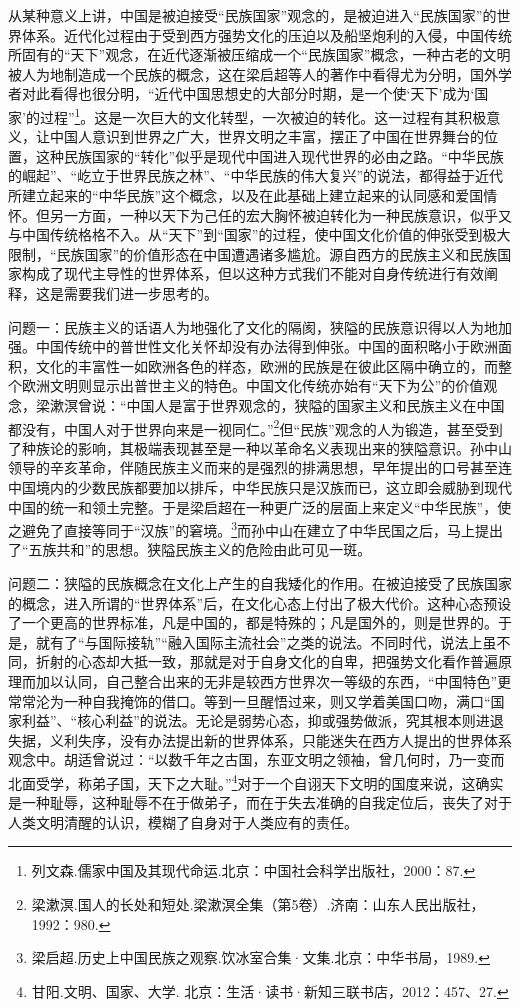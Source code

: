 \documentclass[UTF8, 12pt, a4paper]{ctexrep}
\begin{document}
从某种意义上讲，中国是被迫接受“民族国家”观念的，是被迫进入“民族国家”的世界体系。近代化过程由于受到西方强势文化的压迫以及船坚炮利的入侵，中国传统所固有的“天下”观念，在近代逐渐被压缩成一个“民族国家”概念，一种古老的文明被人为地制造成一个民族的概念，这在梁启超等人的著作中看得尤为分明，国外学者对此看得也很分明，“近代中国思想史的大部分时期，是一个使‘天下’成为‘国家’的过程”\footnote{列文森.儒家中国及其现代命运.北京：中国社会科学出版社，2000：87.}。这是一次巨大的文化转型，一次被迫的转化。这一过程有其积极意义，让中国人意识到世界之广大，世界文明之丰富，摆正了中国在世界舞台的位置，这种民族国家的“转化”似乎是现代中国进入现代世界的必由之路。“中华民族的崛起”、“屹立于世界民族之林”、“中华民族的伟大复兴”的说法，都得益于近代所建立起来的“中华民族”这个概念，以及在此基础上建立起来的认同感和爱国情怀。但另一方面，一种以天下为己任的宏大胸怀被迫转化为一种民族意识，似乎又与中国传统格格不入。从“天下”到“国家”的过程，使中国文化价值的伸张受到极大限制，“民族国家”的价值形态在中国遭遇诸多尴尬。源自西方的民族主义和民族国家构成了现代主导性的世界体系，但以这种方式我们不能对自身传统进行有效阐释，这是需要我们进一步思考的。

问题一：民族主义的话语人为地强化了文化的隔阂，狭隘的民族意识得以人为地加强。中国传统中的普世性文化关怀却没有办法得到伸张。中国的面积略小于欧洲面积，文化的丰富性一如欧洲各色的样态，欧洲的民族是在彼此区隔中确立的，而整个欧洲文明则显示出普世主义的特色。中国文化传统亦始有“天下为公”的价值观念，梁漱溟曾说：“中国人是富于世界观念的，狭隘的国家主义和民族主义在中国都没有，中国人对于世界向来是一视同仁。”\footnote{梁漱溟.国人的长处和短处.梁漱溟全集（第5卷）.济南：山东人民出版社，1992：980.}但“民族”观念的人为锻造，甚至受到了种族论的影响，其极端表现甚至是一种以革命名义表现出来的狭隘意识。孙中山领导的辛亥革命，伴随民族主义而来的是强烈的排满思想，早年提出的口号甚至连中国境内的少数民族都要加以排斥，中华民族只是汉族而已，这立即会威胁到现代中国的统一和领土完整。于是梁启超在一种更广泛的层面上来定义“中华民族”，使之避免了直接等同于“汉族”的窘境。\footnote{梁启超.历史上中国民族之观察.饮冰室合集·文集.北京：中华书局，1989.}而孙中山在建立了中华民国之后，马上提出了“五族共和”的思想。狭隘民族主义的危险由此可见一斑。

问题二：狭隘的民族概念在文化上产生的自我矮化的作用。在被迫接受了民族国家的概念，进入所谓的“世界体系”后，在文化心态上付出了极大代价。这种心态预设了一个更高的世界标准，凡是中国的，都是特殊的；凡是国外的，则是世界的。于是，就有了“与国际接轨”“融入国际主流社会”之类的说法。不同时代，说法上虽不同，折射的心态却大抵一致，那就是对于自身文化的自卑，把强势文化看作普遍原理而加以认同，自己整合出来的无非是较西方世界次一等级的东西，“中国特色”更常常沦为一种自我掩饰的借口。等到一旦醒悟过来，则又学着美国口吻，满口“国家利益”、“核心利益”的说法。无论是弱势心态，抑或强势做派，究其根本则进退失据，义利失序，没有办法提出新的世界体系，只能迷失在西方人提出的世界体系观念中。胡适曾说过：“以数千年之古国，东亚文明之领袖，曾几何时，乃一变而北面受学，称弟子国，天下之大耻。”\footnote{甘阳.文明、国家、大学. 北京：生活·读书·新知三联书店，2012：457、27.}对于一个自诩天下文明的国度来说，这确实是一种耻辱，这种耻辱不在于做弟子，而在于失去准确的自我定位后，丧失了对于人类文明清醒的认识，模糊了自身对于人类应有的责任。
\end{document}
